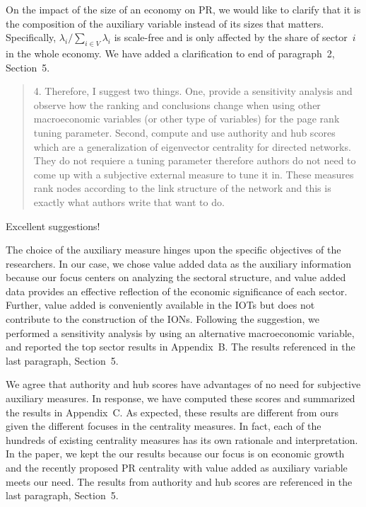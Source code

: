 \documentclass[12pt]{article}
\newenvironment{comment}%
{\begin{quotation}\noindent\small\it\color{darkblue}\ignorespaces%
}{\end{quotation}}
\begin{document}
On the impact of the size of an economy on PR, we would like to clarify
that it is the composition of the auxiliary variable instead of its sizes that
matters. Specifically, $\lambda_i / \sum_{i \in V} \lambda_i$ is scale-free and
is only affected by the share of sector~$i$ in the whole economy. We have added
a clarification to end of paragraph~2, Section~5.


\begin{comment}
4. Therefore, I suggest two things. One, provide a sensitivity analysis and
observe how the ranking and conclusions change when using other macroeconomic
variables (or other type of variables) for the page rank tuning parameter.
Second, compute and use authority and hub scores which are a generalization of
eigenvector centrality for directed networks. They do not requiere a tuning
parameter therefore authors do not need to come up with a subjective external
measure to tune it in. These measures rank nodes according to the link
structure of the network and this is exactly what authors write that want to do.
\end{comment}

Excellent suggestions!


The choice of the auxiliary measure hinges upon the specific objectives 
of the researchers. In our case, we chose value added data as the auxiliary 
information because our focus centers on analyzing the sectoral structure, and 
value added data provides an effective reflection of the economic significance 
of each sector. Further, value added is conveniently available in the IOTs but
does not contribute to the construction of the IONs. Following the suggestion,
we performed a sensitivity analysis by using an alternative macroeconomic
variable, and reported the top sector results in Appendix~B. The results
referenced in the last paragraph, Section~5.


We agree that authority and hub scores have advantages of no need for subjective
auxiliary measures. In response, we have computed these scores and summarized
the results in Appendix~C. As expected, these results are different from ours
given the different focuses in the centrality measures. In fact, each of the
hundreds of existing centrality measures has its own rationale and
interpretation. In the paper, we kept the our results because our focus is on
economic growth and the recently proposed PR centrality with value added
as auxiliary variable meets our need. The results from authority and hub scores
are referenced in the last paragraph, Section~5. 
\end{document}
